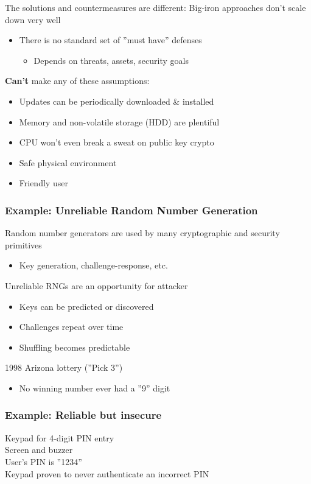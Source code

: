 The solutions and countermeasures are different:
Big-iron approaches don't scale down very well
\begin{itemize}
  \item There is no standard set of ''must have'' defenses
  \begin{itemize}
    \item Depends on threats, assets, security goals
  \end{itemize}
\end{itemize}
\textbf{Can't} make any of these assumptions:
\begin{itemize}
  \item Updates can be periodically downloaded \& installed
  \item Memory and non-volatile storage (HDD) are plentiful
  \item CPU won't even break a sweat on public key crypto
  \item Safe physical environment
  \item Friendly user
\end{itemize}

\subsubsection{Example: Unreliable Random Number Generation}
Random number generators are used by many cryptographic and security primitives
\begin{itemize}
  \item Key generation, challenge-response, etc.
\end{itemize}
Unreliable RNGs are an opportunity for attacker
\begin{itemize}
  \item Keys can be predicted or discovered
  \item Challenges repeat over time
  \item Shuffling becomes predictable
\end{itemize}
1998 Arizona lottery (''Pick 3'')
\begin{itemize}
  \item No winning number ever had a ''9'' digit
\end{itemize}

\subsubsection{Example: Reliable but insecure}
Keypad for 4-digit PIN entry\\
Screen and buzzer\\
User's PIN is ''1234''\\
Keypad proven to never authenticate an incorrect PIN\\

